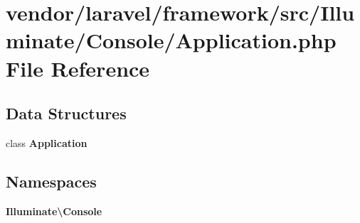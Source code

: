 \section{vendor/laravel/framework/src/\+Illuminate/\+Console/\+Application.php File Reference}
\label{laravel_2framework_2src_2_illuminate_2_console_2_application_8php}
\subsection*{Data Structures}
\begin{DoxyCompactItemize}
\item 
class {\bf Application}
\end{DoxyCompactItemize}
\subsection*{Namespaces}
\begin{DoxyCompactItemize}
\item 
 {\bf Illuminate\textbackslash{}\+Console}
\end{DoxyCompactItemize}
